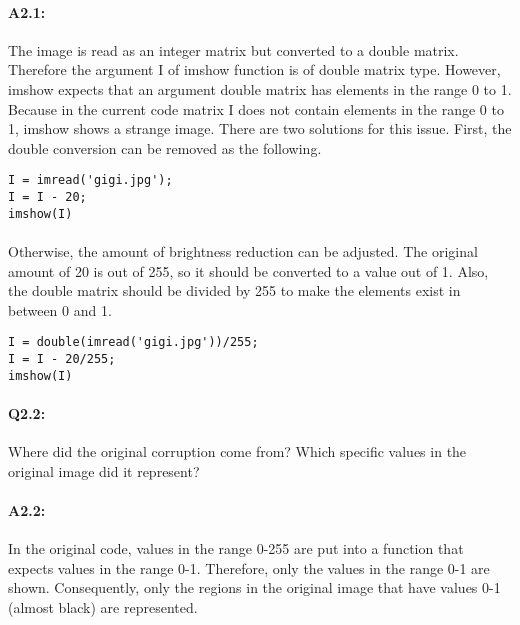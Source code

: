 \documentclass[11pt]{article}
\begin{document}
\paragraph{A2.1:} The image is read as an integer matrix but converted to a double matrix. Therefore the argument I of imshow function is of double matrix type. However, imshow expects that an argument double matrix has elements in the range 0 to 1. Because in the current code matrix I does not contain elements in the range 0 to 1, imshow shows a strange image. There are two solutions for this issue. First, the double conversion can be removed as the following.
\begin{lstlisting}[style=Matlab-editor]
I = imread('gigi.jpg');
I = I - 20;
imshow(I)
\end{lstlisting}
\paragraph{}Otherwise, the amount of brightness reduction can be adjusted. The original amount of 20 is out of 255, so it should be converted to a value out of 1. Also, the double matrix should be divided by 255 to make the elements exist in between 0 and 1.
\begin{lstlisting}[style=Matlab-editor]
I = double(imread('gigi.jpg'))/255;
I = I - 20/255;
imshow(I)
\end{lstlisting}



\pagebreak
\paragraph{Q2.2:} Where did the original corruption come from? Which specific values in the original image did it represent?

\paragraph{A2.2:} In the original code, values in the range 0-255 are put into a function that expects values in the range 0-1. Therefore, only the values in the range 0-1 are shown. Consequently, only the regions in the original image that have values 0-1 (almost black) are represented.



\end{document}
